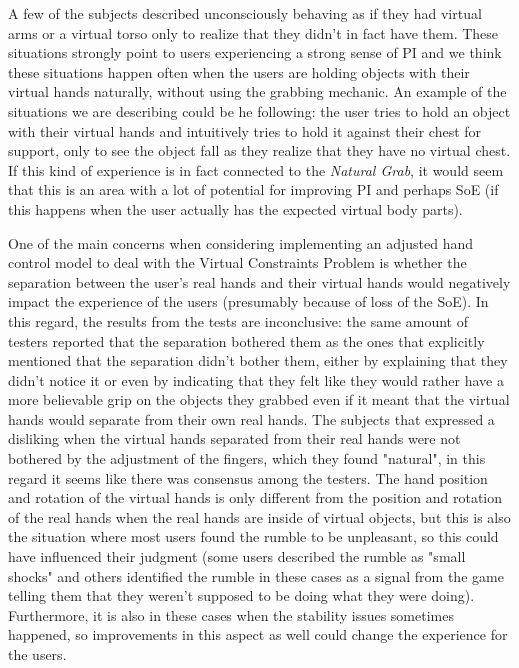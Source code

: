 A few of the subjects described unconsciously behaving as if they had virtual arms or a virtual torso only to realize that they didn't in fact have them. These situations strongly point to users experiencing a strong sense of PI and we think these situations happen often when the users are holding objects with their virtual hands naturally, without using the grabbing mechanic. An example of the situations we are describing could be he following: the user tries to hold an object with their virtual hands and intuitively tries to hold it against their chest for support, only to see the object fall as they realize that they have no virtual chest. If this kind of experience is in fact connected to the \textit{Natural Grab}, it would seem that this is an area with a lot of potential for improving PI and perhaps SoE (if this happens when the user actually has the expected virtual body parts).

One of the main concerns when considering implementing an adjusted hand control model to deal with the Virtual Constraints Problem is whether the separation between the user's real hands and their virtual hands would negatively impact the experience of the users (presumably because of loss of the SoE). In this regard, the results from the tests are inconclusive: the same amount of testers reported that the separation bothered them as the ones that explicitly mentioned that the separation didn't bother them, either by explaining that they didn't notice it or even by indicating that they felt like they would rather have a more believable grip on the objects they grabbed even if it meant that the virtual hands would separate from their own real hands. The subjects that expressed a disliking when the virtual hands separated from their real hands were not bothered by the adjustment of the fingers, which they found "natural", in this regard it seems like there was consensus among the testers. The hand position and rotation of the virtual hands is only different from the position and rotation of the real hands when the real hands are inside of virtual objects, but this is also the situation where most users found the rumble to be unpleasant, so this could have influenced their judgment (some users described the rumble as "small shocks" and others identified the rumble in these cases as a signal from the game telling them that they weren't supposed to be doing what they were doing). Furthermore, it is also in these cases when the stability issues sometimes happened, so improvements in this aspect as well could change the experience for the users. 

